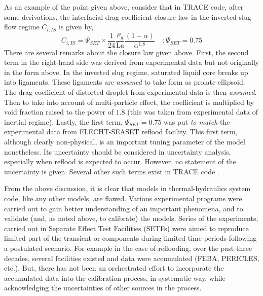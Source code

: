 \documentclass[11pt,titlepage]{article}
\begin{document}
As an example of the point given above, consider that in TRACE code, after some derivations, the interfacial drag coefficient closure law in the inverted slug flow regime $C_{i,IS}$ is given by,
\begin{equation}
C_{i,IS} = \Psi_{SET} \times \frac{1}{24}\frac{\rho_g}{\text{La}}\frac{(1-\alpha)}{\alpha^{1.8}} \; \; \; \; ;\Psi_{SET} = 0.75
\end{equation}
There are several remarks about the closure law given above. First, the second term in the right-hand side was derived from experimental data but not originally in the form above. In the inverted slug regime, saturated liquid core breaks up into ligaments. These ligaments are \emph{assumed} to take form as prolate ellipsoid. The drag coefficient of distorted droplet from experimental data is then \emph{assumed}. Then to take into account of multi-particle effect, the coefficient is multiplied by void fraction raised to the power of $1.8$ (this was taken from experimental data of inertial regime). Lastly, the first term, $\Psi_{SET} = 0.75$ was put \emph{to match} the experimental data from FLECHT-SEASET reflood facility. This first term, although clearly non-physical, is an important tuning parameter of the model nonetheless. Its uncertainty should be considered in uncertainty analysis, especially when reflood is expected to occur. However, no statement of the uncertainty is given. Several other such terms exist in TRACE code \cite{TraceTheory2012}.

From the above discussion, it is clear that models in thermal-hydraulics system code, like any other models, are flawed. Various experimental programs were carried out to gain better understanding of an important phenomena, and to validate (and, as noted above, to calibrate) the models. Series of the experiments, carried out in Separate Effect Test Facilities (SETFs) were aimed to reproduce limited part of the transient or components during limited time periods following a postulated scenario. For example in the case of reflooding, over the past three decades, several facilities existed and data were accumulated (FEBA, PERICLES, etc.). But, there has not been an orchestrated effort to incorporate the accumulated data into the calibration process, in systematic way, while acknowledging the uncertainties of other sources in the process. 

\end{document}
